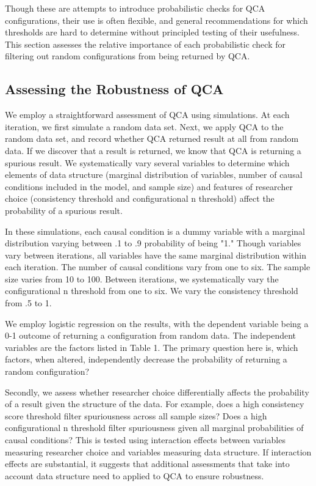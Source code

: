 \documentclass[]{article}
\begin{document}
Though these are attempts to introduce probabilistic checks for QCA configurations, their use is often flexible, and general recommendations for which thresholds are hard to determine without principled testing of their usefulness. This section assesses the relative importance of each probabilistic check for filtering out random configurations from being returned by QCA. 


\subsection{Assessing the Robustness of QCA}

We employ a straightforward assessment of QCA using simulations. At each iteration, we first simulate a random data set. Next, we apply QCA to the random data set, and record whether QCA returned result at all from random data. If we discover that a result is returned, we know that QCA is returning a spurious result. We systematically vary several variables to determine which elements of data structure (marginal distribution of variables, number of causal conditions included in the model, and sample size) and features of researcher choice (consistency threshold and configurational n threshold) affect the probability of a spurious result.  %

In these simulations, each causal condition is a dummy variable with a marginal distribution varying between .1 to .9 probability of being "1." Though variables vary between iterations, all variables have the same marginal distribution within each iteration. The number of causal conditions vary from one to six. The sample size varies from 10 to 100. Between iterations, we systematically vary the configurational n threshold from one to six. We vary the consistency threshold from .5 to 1.

We employ logistic regression on the results, with the dependent variable being a 0-1 outcome of returning a configuration from random data. The independent variables are the factors listed in Table 1. The primary question here is, which factors, when altered, independently decrease the probability of returning a random configuration?

Secondly, we assess whether researcher choice differentially affects the probability of a result given the structure of the data. For example, does a high consistency score threshold filter spuriousness across all sample sizes? Does a high configurational n threshold filter spuriousness given all marginal probabilities of causal conditions? This is tested using interaction effects between variables measuring researcher choice and variables measuring data structure. If interaction effects are substantial, it suggests that additional assessments that take into account data structure need to applied to QCA to ensure robustness.
\end{document}
